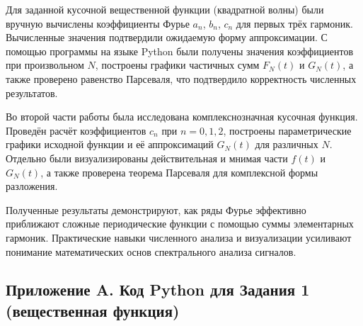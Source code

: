Для заданной кусочной вещественной функции (квадратной волны) были вручную вычислены коэффициенты Фурье $a_n$, $b_n$, $c_n$ для первых трёх гармоник. Вычисленные значения подтвердили ожидаемую форму аппроксимации. С помощью программы на языке Python были получены значения коэффициентов при произвольном $N$, построены графики частичных сумм $F_N(t)$ и $G_N(t)$, а также проверено равенство Парсеваля, что подтвердило корректность численных результатов.

Во второй части работы была исследована комплекснозначная кусочная функция. Проведён расчёт коэффициентов $c_n$ при $n = 0, 1, 2$, построены параметрические графики исходной функции и её аппроксимаций $G_N(t)$ для различных $N$. Отдельно были визуализированы действительная и мнимая части $f(t)$ и $G_N(t)$, а также проверена теорема Парсеваля для комплексной формы разложения.

Полученные результаты демонстрируют, как ряды Фурье эффективно приближают сложные периодические функции с помощью суммы элементарных гармоник. Практические навыки численного анализа и визуализации усиливают понимание математических основ спектрального анализа сигналов.


\subsection*{Приложение A. Код Python для Задания 1 (вещественная функция)}

